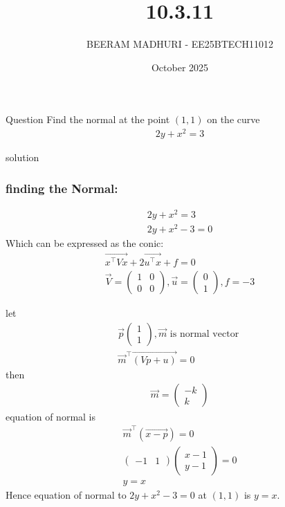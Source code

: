 \documentclass{beamer}
\title %
{10.3.11}
\date{October  2025}
\author %
{BEERAM MADHURI - EE25BTECH11012}
\begin{document}
\frame{\titlepage}
\begin{frame}{Question}
Find the normal at the point $(1,1)$ on the curve
\begin{align}
2y + x^2 = 3
\end{align}
\end{frame}

\begin{frame}{solution}
    \frametitle{finding the Normal:}
\begin{align}
    2y + x^2 = 3\\
    2y + x^2 -3 = 0
\end{align}
Which can be expressed as the conic:
\begin{align}
\vec{x^\top V x} + 2\vec{u^\top x} + f = 0\\
\vec{V} = \begin{pmatrix}1 & 0 \\0 & 0\end{pmatrix}, \vec{u} = \begin{pmatrix}0 \\1\end{pmatrix}, f = -3
\end{align}
\end{frame}
\begin{frame}
let 
\begin{align}
\vec{p} \begin{pmatrix} 1 \\ 1 \end{pmatrix} , \vec{m} \text{ is normal vector }\\
\vec{m}^\top \vec{(Vp + u)} = 0
\end{align}
then
\begin{align}
\vec{m} = \begin{pmatrix} -k \\ k \end{pmatrix}
\end{align}
equation of normal is
\begin{align}
    \vec{m}^\top(\vec{x-p})=0\\
    \begin{pmatrix} -1&1\end{pmatrix}\begin{pmatrix}x-1\\y-1   \end{pmatrix}=0\\
        y=x
\end{align}
Hence equation of normal to $2y + x^2 - 3 = 0$ at $(1,1)$ is $y = x$.
\end{frame}
\end{document}
